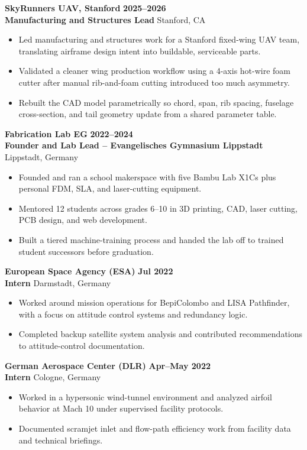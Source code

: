 \documentclass[10pt,letterpaper]{article}
\newcommand{\role}[4]{
  \textbf{#1} \hfill {\color{muted}\textbf{#4}}\\
  {\color{accent}\textbf{#2}} \hfill {\color{muted}#3}
  \vspace{2pt}
}
\begin{document}
\role{SkyRunners UAV, Stanford}{Manufacturing and Structures Lead}{Stanford, CA}{2025--2026}
\begin{itemize}
  \item Led manufacturing and structures work for a Stanford fixed-wing UAV team, translating airframe design intent into buildable, serviceable parts.
  \item Validated a cleaner wing production workflow using a 4-axis hot-wire foam cutter after manual rib-and-foam cutting introduced too much asymmetry.
  \item Rebuilt the CAD model parametrically so chord, span, rib spacing, fuselage cross-section, and tail geometry update from a shared parameter table.
\end{itemize}

\role{Fabrication Lab EG}{Founder and Lab Lead -- Evangelisches Gymnasium Lippstadt}{Lippstadt, Germany}{2022--2024}
\begin{itemize}
  \item Founded and ran a school makerspace with five Bambu Lab X1Cs plus personal FDM, SLA, and laser-cutting equipment.
  \item Mentored 12 students across grades 6--10 in 3D printing, CAD, laser cutting, PCB design, and web development.
  \item Built a tiered machine-training process and handed the lab off to trained student successors before graduation.
\end{itemize}

\role{European Space Agency (ESA)}{Intern}{Darmstadt, Germany}{Jul 2022}
\begin{itemize}
  \item Worked around mission operations for BepiColombo and LISA Pathfinder, with a focus on attitude control systems and redundancy logic.
  \item Completed backup satellite system analysis and contributed recommendations to attitude-control documentation.
\end{itemize}

\role{German Aerospace Center (DLR)}{Intern}{Cologne, Germany}{Apr--May 2022}
\begin{itemize}
  \item Worked in a hypersonic wind-tunnel environment and analyzed airfoil behavior at Mach 10 under supervised facility protocols.
  \item Documented scramjet inlet and flow-path efficiency work from facility data and technical briefings.
\end{itemize}
\end{document}
